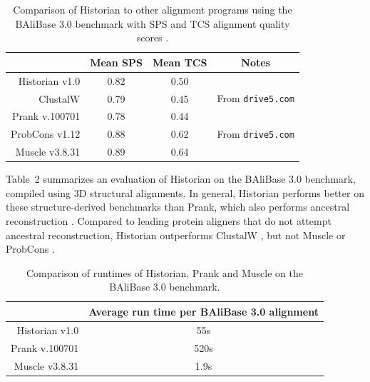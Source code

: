 \documentclass{bioinfo}
\begin{document}
\begin{table}
  \begin{tabular}{r|ccc}
    & Mean SPS & Mean TCS & Notes \\
    \hline
Historian v1.0 & 0.82 & 0.50 & \\
ClustalW & 0.79 & 0.45 & From {\tt drive5.com} \\
Prank v.100701 & 0.78 & 0.44 \\
ProbCons v1.12 & 0.88 & 0.62 & From {\tt drive5.com} \\
Muscle v3.8.31 & 0.89 & 0.64 & 
  \end{tabular}
  \caption{
    Comparison of Historian to other alignment programs using the BAliBase 3.0 benchmark
    with SPS and TCS alignment quality scores \citep{ThompsonEtAl2005}.
  }
\end{table}

Table~2 summarizes an evaluation of Historian
on the BAliBase 3.0 benchmark,
compiled using 3D structural alignments.
%
In general, Historian performs better on these structure-derived benchmarks than Prank,
which also performs ancestral reconstruction \citep{LoytynojaGoldman2008}.
Compared to leading protein aligners that do not attempt ancestral reconstruction,
Historian outperforms ClustalW \citep{LarkinEtAl2007}, but not Muscle \citep{Edgar2004b}
or ProbCons \citep{DoEtAl2005}. %

\begin{table}
  \begin{tabular}{r|c}
    & Average run time per BAliBase 3.0 alignment \\
    \hline
Historian v1.0 & 55s \\
Prank v.100701 & 520s \\
Muscle v3.8.31 & 1.9s \\
\end{tabular}
\caption{
    Comparison of runtimes of Historian, Prank and Muscle on the BAliBase 3.0 benchmark.
  }
\end{table}
\end{document}
